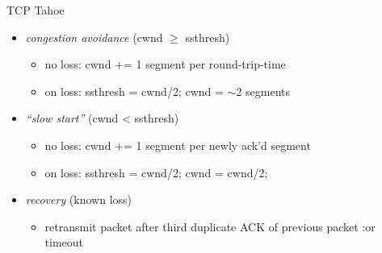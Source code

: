 \begin{frame}{TCP Tahoe}
    \begin{itemize}
    \item \textit{congestion avoidance} (cwnd $\ge$ ssthresh)
        \begin{itemize}
        \item no loss: cwnd += 1 segment per round-trip-time
        \item on loss: ssthresh = cwnd/2; cwnd = $\sim$2 segments
        \end{itemize}
    \item \textit{``slow start''} (cwnd < ssthresh)
        \begin{itemize}
        \item no loss: cwnd += 1 segment per newly ack'd segment
        \item on loss: ssthresh = cwnd/2; cwnd = cwnd/2;
        \end{itemize}
    \item \textit{recovery} (known loss)
        \begin{itemize}
        \item retransmit packet after third duplicate ACK of previous packet :or timeout
        \end{itemize}
    \end{itemize}
\end{frame}
